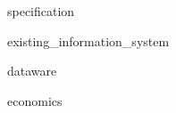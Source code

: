 \documentclass[a4paper,utf8,pointsection]{eskdtext}
\begin{document}






\begin{ESKDtitlePage}\end{ESKDtitlePage}
\tableofcontents
\newpage


{specification}

{existing_information_system}

{dataware}

{economics}

\end{document}
